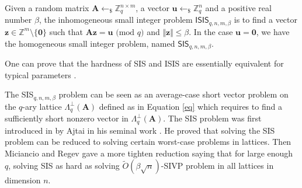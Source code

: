 \documentclass[runningheads]{llncs}
\begin{document}


\begin{definition} \label{def2}
	Given a random matrix $\mathbf{A} \leftarrow_{\$} \mathbb{Z}_q^{n \times m}$, a vector $\mathbf{u} \leftarrow_{\$} \mathbb{Z}_q^{n}$ and a positive real number $\beta$, the inhomogeneous small integer problem $\mathsf{ISIS}_{q,n,m, \beta}$ is to find a vector $\mathbf{z}\in \mathbb{Z}^{m} \setminus \{\mathbf{0}\}$ such that $\mathbf{A}\mathbf{z} =\mathbf{u} \text{ (mod } q)$ and $\Vert \mathbf{z}\Vert \leq \beta.$  In the case $\mathbf{u}=\mathbf{0}$, we have the homogeneous small integer problem, named $\mathsf{SIS}_{q,n,m, \beta}$.
\end{definition}


One can prove that the hardness of \textsf{SIS} and \textsf{ISIS} are essentially equivalent for typical parameters \cite[Chapter 4]{Pei16}. 
\iffalse
The following lemma gives a condition on parameters for the existence of a solution to the \textsf{SIS} problem.

\begin{lemma}[Lemma 5.2 in \cite{MR07}] \label{lemso}
	For any $q$, matrix $\mathbf{A} \in \mathbb{Z}_q^{n \times m}$ and $\beta \geq \sqrt{m}q^{n/m}$, the \textsf{SIS$_{q,n,m, \beta}$} has at least one solution.
\end{lemma}

\fi
The \textsf{SIS$_{q,n,m, \beta}$} problem can be seen as an average-case short vector problem on the $q$-ary lattice $\Lambda_q^{\bot}(\mathbf{A})$ defined as in Equation \eqref{eq} which requires to  find a sufficiently short nonzero vector in $\Lambda_q^{\bot}(\mathbf{A})$. The \textsf{SIS} problem was first introduced in by Ajtai in his seminal work \cite{Ajt96}. He proved that solving the \textsf{SIS} problem can be reduced to solving certain worst-case problems in lattices. Then Miciancio and Regev \cite{MR07} gave a more tighten reduction saying that for large enough $q$, solving \textsf{SIS} as hard as solving $\tilde{O}(\beta\sqrt{n})$-\textsf{SIVP} problem in all lattices in dimension $n$.  
\end{document}
